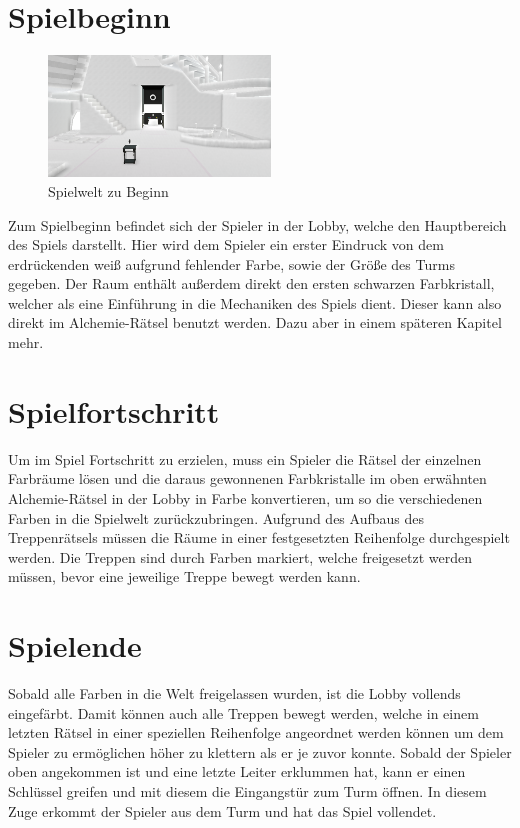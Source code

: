 \newpage
\noindent
\section{Spielbeginn}
\begin{figure}
	\vspace*{-0.5cm}
	\includegraphics[width=5.9cm]{Pictures/Lobby_Start}
	\caption{Spielwelt zu Beginn}
	\vspace*{-0.5cm}
	\label{fig:spielwelt-beginn}
\end{figure}

Zum Spielbeginn befindet sich der Spieler in der Lobby, welche den Hauptbereich des Spiels darstellt. Hier wird dem Spieler ein erster Eindruck von dem erdrückenden weiß aufgrund fehlender Farbe, sowie der Größe des Turms gegeben. Der Raum enthält außerdem direkt den ersten schwarzen Farbkristall, welcher als eine Einführung in die Mechaniken des Spiels dient. Dieser kann also direkt im Alchemie-Rätsel benutzt werden. Dazu aber in einem späteren Kapitel mehr.\\

\section{Spielfortschritt}
Um im Spiel Fortschritt zu erzielen, muss ein Spieler die Rätsel der einzelnen Farbräume lösen und die daraus gewonnenen Farbkristalle im oben erwähnten Alchemie-Rätsel in der Lobby in Farbe konvertieren, um so die verschiedenen Farben in die Spielwelt zurückzubringen.
Aufgrund des Aufbaus des Treppenrätsels müssen die Räume in einer festgesetzten Reihenfolge durchgespielt werden. Die Treppen sind durch Farben markiert, welche freigesetzt werden müssen, bevor eine jeweilige Treppe bewegt werden kann.

\section{Spielende}
Sobald alle Farben in die Welt freigelassen wurden, ist die Lobby vollends eingefärbt. Damit können auch alle Treppen bewegt werden, welche in einem letzten Rätsel in einer speziellen Reihenfolge angeordnet werden können um dem Spieler zu ermöglichen höher zu klettern als er je zuvor konnte. Sobald der Spieler oben angekommen ist und eine letzte Leiter erklummen hat, kann er einen Schlüssel greifen und mit diesem die Eingangstür zum Turm öffnen. In diesem Zuge erkommt der Spieler aus dem Turm und hat das Spiel vollendet.


